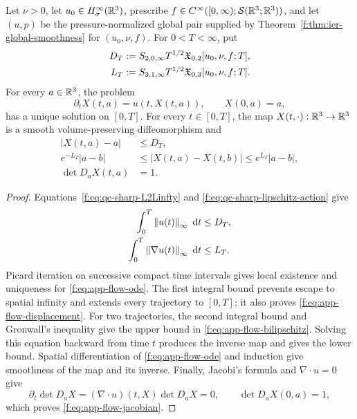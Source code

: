 \begin{theorem}
\label{f:thm:app-material-flow}
Let \(\nu>0\), let \(u_0\in H^\infty_\sigma(\mathbb R^3)\), prescribe
\(f\in C^\infty([0,\infty);\mathcal S(\mathbb R^3;\mathbb R^3))\), and let \((u,p)\) be
the pressure-normalized global pair supplied by
Theorem~\ref{f:thm:ier-global-smoothness} for \((u_0,\nu,f)\).
For \(0<T<\infty\), put
\begin{align}
 D_T&:=S_{2,0,\infty}T^{1/2}
 \mathfrak X_{0,2}[u_0,\nu,f;T],\notag\\
 L_T&:=S_{3,1,\infty}T^{1/2}
 \mathfrak X_{0,3}[u_0,\nu,f;T].
 \label{f:eq:app-flow-actions}
\end{align}
For every \(a\in\mathbb R^3\), the problem
\begin{equation}
 \partial_tX(t,a)=u(t,X(t,a)),
 \qquad X(0,a)=a,
 \label{f:eq:app-flow-ode}
\end{equation}
has a unique solution on \([0,T]\).  For every \(t\in[0,T]\), the map
\(X(t,\cdot):\mathbb R^3\to\mathbb R^3\) is a smooth volume-preserving diffeomorphism
and
\begin{align}
 |X(t,a)-a|&\le D_T,
 \label{f:eq:app-flow-displacement}\\
 e^{-L_T}|a-b|
 &\le|X(t,a)-X(t,b)|
 \le e^{L_T}|a-b|,
 \label{f:eq:app-flow-bilipschitz}\\
 \det D_aX(t,a)&=1.
 \label{f:eq:app-flow-jacobian}
\end{align}
\end{theorem}

\begin{proof}
Equations~\eqref{f:eq:qc-sharp-L2Linfty} and
\eqref{f:eq:qc-sharp-lipschitz-action} give
\begin{align*}
 \int_0^T\left\lVert u(t)\right\rVert_\infty\,\,\mathrm d t&\le D_T,\\
 \int_0^T\left\lVert \nabla u(t)\right\rVert_\infty\,\,\mathrm d t&\le L_T.
\end{align*}
Picard iteration on successive compact time intervals gives local
existence and uniqueness for \eqref{f:eq:app-flow-ode}.  The first integral
bound prevents escape to spatial infinity and extends every trajectory to
\([0,T]\); it also proves \eqref{f:eq:app-flow-displacement}.  For two
trajectories, the second integral bound and Gronwall's inequality give the
upper bound in \eqref{f:eq:app-flow-bilipschitz}.  Solving this equation
backward from time \(t\) produces the inverse map and gives the lower
bound.  Spatial differentiation of \eqref{f:eq:app-flow-ode} and induction
give smoothness of the map and its inverse.  Finally, Jacobi's formula and
\(\nabla\cdot u=0\) give
\[
 \partial_t\det D_aX
 =(\nabla\cdot u)(t,X)\det D_aX=0,
 \qquad \det D_aX(0,a)=1,
\]
which proves \eqref{f:eq:app-flow-jacobian}.
\end{proof}

